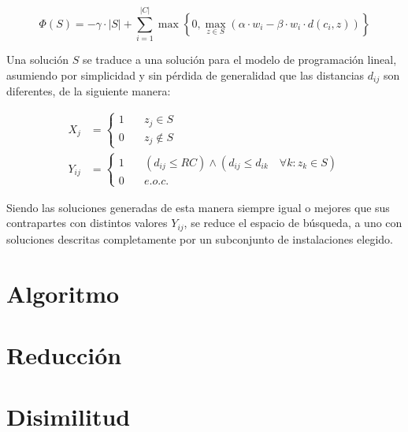 \documentclass{article}
\begin{document}
\begin{equation}
\Phi(S) = -\gamma \cdot |S| + \sum_{i=1}^{|C|} \max \left\{ 0 , \max_{z \in S} ( \alpha \cdot w_i - \beta \cdot w_i \cdot d(c_i,z)) \right\}
\end{equation}

Una solución $S$ se traduce a una solución para el modelo de programación lineal, asumiendo por simplicidad y sin pérdida de generalidad que las distancias $d_{ij}$ son diferentes, de la siguiente manera:

\begin{align*}
    X_{j} &= \begin{cases}
        1 &\quad z_j \in S \\
        0 &\quad z_j \notin S
    \end{cases}\\
    Y_{ij} &= \begin{cases}
        1 &\quad (d_{ij} \leq RC) \wedge (d_{ij} \leq d_{ik} \quad \forall k : z_k \in S)
        \\
        0 &\quad e.o.c.
    \end{cases}
\end{align*}

Siendo las soluciones generadas de esta manera siempre igual o mejores que sus contrapartes con distintos valores $Y_{ij}$, se reduce el espacio de búsqueda, a uno con soluciones descritas completamente por un subconjunto de instalaciones elegido.

\section{Algoritmo}



\section{Reducción}

\section{Disimilitud}


{}
\end{document}
